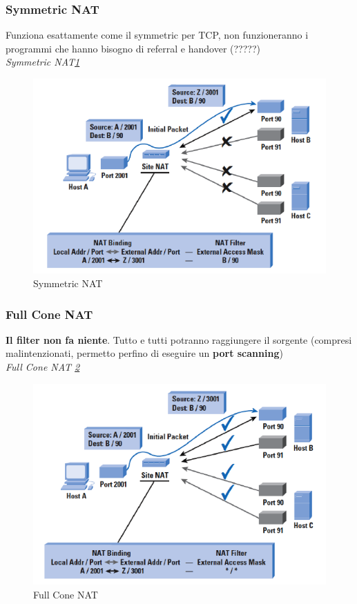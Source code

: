 \documentclass[12pt]{article}
\begin{document}
			\subsubsection{Symmetric NAT}
				Funziona esattamente come il symmetric per TCP, non funzioneranno i programmi che hanno bisogno di referral e handover (?????)\\
				
				\textit{Symmetric NAT\ref{fig:8}}\\
				\begin{figure}[h!]
					\centering
					\includegraphics[scale=0.60]{img/sym.PNG}
					\caption{Symmetric NAT\label{fig:8}}
				\end{figure}
				
			\subsubsection{Full Cone NAT}
			 	\textbf{Il filter non fa niente}. Tutto e tutti potranno raggiungere  il sorgente (compresi malintenzionati, permetto perfino di eseguire un \textbf{port scanning})\\
			 	
			 	\textit{Full Cone NAT \ref{fig:9}}\\
			 	\begin{figure}[h!]
			 		\centering
			 		\includegraphics[scale=0.60]{img/cone.PNG}
			 		\caption{Full Cone NAT\label{fig:9}}
			 	\end{figure}\\
			 
\end{document}
